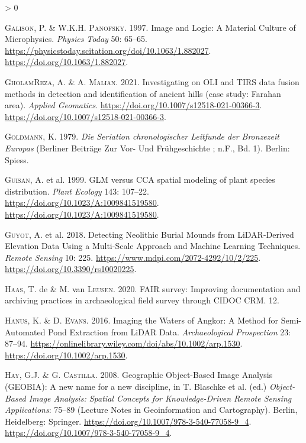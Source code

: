 \documentclass[
  12pt,
]{article}
\newlength{\cslhangindent}
\newenvironment{CSLReferences}[2] %
 {%
  \setlength{\parindent}{0pt}
  \ifodd #1 \everypar{\setlength{\hangindent}{\cslhangindent}}\ignorespaces\fi
  \ifnum #2 > 0
  \setlength{\parskip}{#2\baselineskip}
  \fi
 }%
 {}
\begin{document}
\begin{CSLReferences}{1}{0}
\leavevmode\hypertarget{ref-galisonImageLogicMaterial1997}{}%
\textsc{Galison}, P. \& W.K.H. \textsc{Panofsky}. 1997. Image and {Logic}: {A} {Material} {Culture} of {Microphysics}. \emph{Physics Today} 50: 65--65. \url{https://physicstoday.scitation.org/doi/10.1063/1.882027}. \url{https://doi.org/10.1063/1.882027}.

\leavevmode\hypertarget{ref-gholamrezaInvestigatingOLITIRS2021}{}%
\textsc{GholamReza}, A. \& A. \textsc{Malian}. 2021. Investigating on {OLI} and {TIRS} data fusion methods in detection and identification of ancient hills (case study: {Farahan} area). \emph{Applied Geomatics}. \url{https://doi.org/10.1007/s12518-021-00366-3}. \url{https://doi.org/10.1007/s12518-021-00366-3}.

\leavevmode\hypertarget{ref-goldmannSeriationChronologischerLeitfunde1979}{}%
\textsc{Goldmann}, K. 1979. \emph{Die {Seriation} chronologischer {Leitfunde} der {Bronzezeit} {Europas}} (Berliner {Beiträge} Zur {Vor}- Und {Frühgeschichte} ; n.{F}., {Bd}. 1). Berlin: Spiess.

\leavevmode\hypertarget{ref-guisanGLMCCASpatial1999}{}%
\textsc{Guisan}, A. et al. 1999. {GLM} versus {CCA} spatial modeling of plant species distribution. \emph{Plant Ecology} 143: 107--22. \url{https://doi.org/10.1023/A:1009841519580}. \url{https://doi.org/10.1023/A:1009841519580}.

\leavevmode\hypertarget{ref-guyotDetectingNeolithicBurial2018a}{}%
\textsc{Guyot}, A. et al. 2018. Detecting {Neolithic} {Burial} {Mounds} from {LiDAR}-{Derived} {Elevation} {Data} {Using} a {Multi}-{Scale} {Approach} and {Machine} {Learning} {Techniques}. \emph{Remote Sensing} 10: 225. \url{https://www.mdpi.com/2072-4292/10/2/225}. \url{https://doi.org/10.3390/rs10020225}.

\leavevmode\hypertarget{ref-dehaasFAIRSurveyImproving2020}{}%
\textsc{Haas}, T. de \& M. van \textsc{Leusen}. 2020. {FAIR} survey: Improving documentation and archiving practices in archaeological field survey through {CIDOC} {CRM}. 12.

\leavevmode\hypertarget{ref-hanusImagingWatersAngkor2016}{}%
\textsc{Hanus}, K. \& D. \textsc{Evans}. 2016. Imaging the {Waters} of {Angkor}: {A} {Method} for {Semi}-{Automated} {Pond} {Extraction} from {LiDAR} {Data}. \emph{Archaeological Prospection} 23: 87--94. \url{https://onlinelibrary.wiley.com/doi/abs/10.1002/arp.1530}. \url{https://doi.org/10.1002/arp.1530}.

\leavevmode\hypertarget{ref-hayGeographicObjectBasedImage2008a}{}%
\textsc{Hay}, G.J. \& G. \textsc{Castilla}. 2008. Geographic {Object}-{Based} {Image} {Analysis} ({GEOBIA}): {A} new name for a new discipline, in T. Blaschke et al. (ed.) \emph{Object-{Based} {Image} {Analysis}: {Spatial} {Concepts} for {Knowledge}-{Driven} {Remote} {Sensing} {Applications}}: 75--89 (Lecture {Notes} in {Geoinformation} and {Cartography}). Berlin, Heidelberg: Springer. \url{https://doi.org/10.1007/978-3-540-77058-9_4}. \url{https://doi.org/10.1007/978-3-540-77058-9_4}.


\end{CSLReferences}
\end{document}
